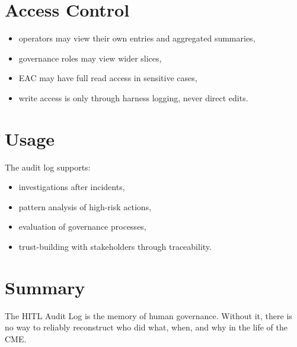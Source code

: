 \section{Access Control}

\begin{itemize}
    \item operators may view their own entries and aggregated summaries,
    \item governance roles may view wider slices,
    \item EAC may have full read access in sensitive cases,
    \item write access is only through harness logging, never direct edits.
\end{itemize}

\section{Usage}

The audit log supports:
\begin{itemize}
    \item investigations after incidents,
    \item pattern analysis of high-risk actions,
    \item evaluation of governance processes,
    \item trust-building with stakeholders through traceability.
\end{itemize}

\section{Summary}

The HITL Audit Log is the memory of human governance. Without it, there is
no way to reliably reconstruct who did what, when, and why in the life of
the CME.
